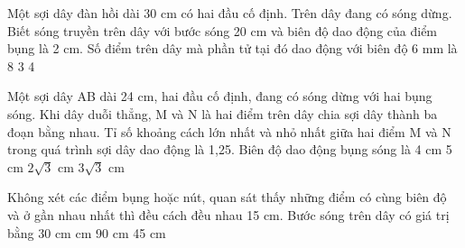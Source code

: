 \begin{vidu}%
Một sợi dây đàn hồi dài 30 cm có hai đầu cố định. Trên dây đang có sóng dừng. Biết sóng truyền trên dây với bước sóng 20 cm và biên độ dao động của điểm bụng là 2 cm. Số điểm trên dây mà phần tử tại đó dao động với biên độ 6 mm là
\choice
{8}
{}
{3}
{4}
\end{vidu} 

\begin{vidu}%
Một sợi dây AB dài 24 cm, hai đầu cố định, đang có sóng dừng với hai bụng sóng. Khi dây duỗi thẳng, M và N là hai điểm trên dây chia sợi dây thành ba đoạn bằng nhau. Tỉ số khoảng cách lớn nhất và nhỏ nhất giữa hai điểm M và N trong quá trình sợi dây dao động là 1,25. Biên độ dao động bụng sóng là
\choice
{4 cm}
{5 cm}
{\True $2\sqrt{3}$ cm}
{$3\sqrt{3}$ cm}
\end{vidu} 
\begin{vidu}%
Không xét các điểm bụng hoặc nút, quan sát thấy những điểm có cùng biên độ và ở gần nhau nhất thì đều cách đều nhau 15 cm. Bước sóng trên dây có giá trị bằng
\choice
{30 cm}
{ cm}
{90 cm}
{45 cm}
\end{vidu} 
